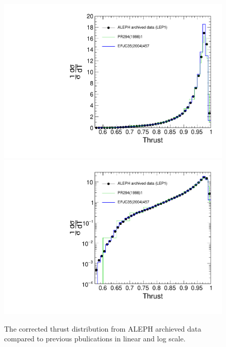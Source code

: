 \begin{figure}[H]
\centering
\includegraphics[width=.5\textwidth]{images/Thrust/mithig_T_LEP1_0_9999.pdf}
\includegraphics[width=.5\textwidth]{images/Thrust/mithig_T_log_LEP1_0_9999.pdf}
\caption{The corrected thrust distribution from ALEPH archieved data compared to previous pbulications in linear and log scale.}
\label{fig:ThrustResult}
\end{figure}
